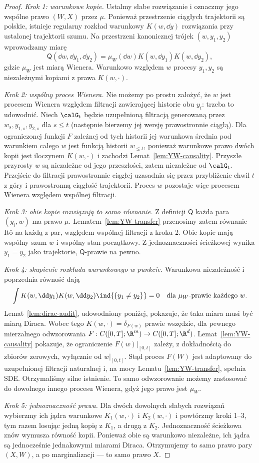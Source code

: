 \begin{proof}
\emph{Krok 1: warunkowe kopie.} Ustalmy słabe rozwiązanie
i oznaczmy jego wspólne prawo $(W,X)$ przez $\mu$.
Ponieważ przestrzenie ciągłych trajektorii są polskie,
istnieje regularny rozkład warunkowy $K(w,\dd y)$
rozwiązania przy ustalonej trajektorii szumu.
Na przestrzeni kanonicznej trójek $(w,y_1,y_2)$
wprowadzamy miarę
\[
 \mathsf Q(\dd w,\dd y_1,\dd y_2)
 =\mu_W(\dd w)K(w,\dd y_1)K(w,\dd y_2),
\]
gdzie $\mu_W$ jest miarą Wienera. Warunkowo względem
$w$ procesy $y_1,y_2$ są niezależnymi kopiami z prawa
$K(w,\cdot)$.

\emph{Krok 2: wspólny proces Wienera.} Nie możemy po prostu
założyć, że $w$ jest procesem Wienera względem filtracji
zawierającej historie obu $y_i$: trzeba to udowodnić.
Niech $\calG_t$ będzie uzupełnioną filtracją generowaną
przez $w_s,y_{1,s},y_{2,s}$ dla $s\le t$ (następnie bierzemy
jej wersję prawostronnie ciągłą). Dla ograniczonej funkcji
$F$ zależnej od tych historii jej warunkowa średnia pod
warunkiem całego $w$ jest funkcją historii $w_{\le t}$,
ponieważ warunkowe prawo dwóch kopii jest iloczynem
$K(w,\cdot)$ i zachodzi Lemat~\ref{lem:YW-causality}.
Przyszłe przyrosty $w$ są niezależne od jego przeszłości,
zatem niezależne od $\calG_t$. Przejście do filtracji
prawostronnie ciągłej uzasadnia się przez przybliżenie
chwil $t$ z góry i prawostronną ciągłość trajektorii.
Proces $w$ pozostaje więc procesem Wienera względem
wspólnej filtracji.

\emph{Krok 3: obie kopie rozwiązują to samo równanie.}
Z definicji $\mathsf Q$ każda para $(y_i,w)$ ma prawo
$\mu$. Lematem~\ref{lem:YW-transfer} przenosimy zatem
równanie Itô na każdą z par, względem wspólnej filtracji
z kroku 2. Obie kopie mają wspólny szum $w$ i wspólny
stan początkowy. Z jednoznaczności ścieżkowej wynika
$y_1=y_2$ jako trajektorie, $\mathsf Q$-prawie na pewno.

\emph{Krok 4: skupienie rozkładu warunkowego w punkcie.}
Warunkowa niezależność i poprzednia równość dają
\[
 \int K(w,\dd y_1)K(w,\dd y_2)
 \ind{\{y_1\ne y_2\}}=0
 \quad\text{dla }\mu_W\text{-prawie każdego }w.
\]
Lemat~\ref{lem:dirac-audit}, udowodniony poniżej,
pokazuje, że taka miara musi być miarą Diraca.
Wobec tego $K(w,\cdot)=\delta_{F(w)}$ prawie wszędzie,
dla pewnego mierzalnego odwzorowania
$F:C([0,T];\R^m)\to C([0,T];\R^d)$.
Lemat~\ref{lem:YW-causality} pokazuje, że ograniczenie
$F(w)|_{[0,t]}$ zależy, z dokładnością do zbiorów zerowych,
wyłącznie od $w|_{[0,t]}$. Stąd proces $F(W)$ jest
adaptowany do uzupełnionej filtracji naturalnej i,
na mocy Lematu~\ref{lem:YW-transfer}, spełnia SDE.
Otrzymaliśmy silne istnienie. To samo odwzorowanie możemy
zastosować do dowolnego innego procesu Wienera, gdyż jego
prawo jest $\mu_W$.

\emph{Krok 5: jednoznaczność prawa.} Dla dwóch dowolnych
słabych rozwiązań wybierzmy ich jądra warunkowe
$K_1(w,\cdot)$ i $K_2(w,\cdot)$ i powtórzmy kroki 1--3,
tym razem losując jedną kopię z $K_1$, a drugą z $K_2$.
Jednoznaczność ścieżkowa znów wymusza równość kopii.
Ponieważ obie są warunkowo niezależne, ich jądra są
jednocześnie jednakowymi miarami Diraca. Otrzymujemy
to samo prawo pary $(X,W)$, a po marginalizacji ---
to samo prawo $X$.
\end{proof}

